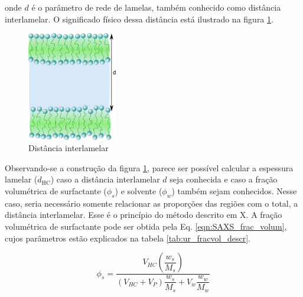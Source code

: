 		\noindent onde \(d\) é o parâmetro de rede de lamelas, também conhecido como distância interlamelar. O significado físico dessa distância está ilustrado na figura \ref{fig:saxs_distancia_interlamelar}.
				
		\begin{figure}[h]
			\centering
			\includegraphics[width=0.35\textwidth]{imagens/saxs/distancia_interlamelar}
			\caption{Distância interlamelar}
			\label{fig:saxs_distancia_interlamelar}
		\end{figure}

		Observando-se a construção da figura \ref{fig:saxs_distancia_interlamelar}, parece ser possível calcular a espessura lamelar (\(d_{\text{HC}}\)) caso a distância interlamelar \(d\) seja conhecida e caso a fração volumétrica de surfactante (\(\phi_s\)) e solvente (\(\phi_w\)) também sejam conhecidos. Nesse caso, seria necessário somente relacionar as proporções das regiões com o total, a distância interlamelar. Esse é o princípio do método descrito em X. A fração volumétrica de surfactante pode ser obtida pela Eq. \ref{eqn:SAXS_frac_volum}, cujos parâmetros estão explicados na tabela \ref{tab:ur_fracvol_descr}.
		
		\begin{equation}
			\phi_s = \dfrac{V_{\textit{HC}}\left( \dfrac{w_{s}}{M_{s}} \right)}{\left( V_{\textit{HC}} + V_{P} \right)\dfrac{w_{s}}{M_{s}} + V_{w}\dfrac{w_{w}}{M_{w}}}
			\label{eqn:SAXS_frac_volum}
		\end{equation}
		
	
